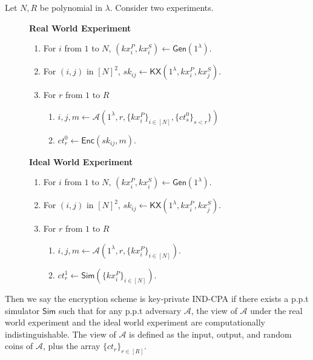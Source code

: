 \documentclass[sigconf, nonacm, balance=false, natbib=false, screen]{acmart}
\newcommand{\gen}{\mathsf{Gen}}
\newcommand{\enc}{\mathsf{Enc}}
\newcommand{\Sim}{\mathsf{Sim}}
\newcommand{\cA}{\mathcal{A}}
\begin{document}
\begin{definition}
Let $N, R$ be polynomial in $\lambda$. Consider two experiments.
\begin{figure}[h!]
\begin{framed}
\textbf{Real World Experiment}
\begin{enumerate}
    \item For $i$ from $1$ to $N$, $(kx_i^P, kx_i^S) \leftarrow \gen(1^{\lambda}).$
    \item For $(i, j)$ in $[N]^2$, $sk_{ij} \leftarrow \mathsf{KX}(1^{\lambda}, kx_i^P, kx_j^S)$.
    \item For $r$ from $1$ to $R$
    \begin{enumerate}
        \item $i, j, m \leftarrow \cA(1^{\lambda}, r, \{kx_i^P\}_{i \in [N]}, \{ct_{s}^0\}_{s < r}\})$
        \item $ct^{0}_r \leftarrow \enc(sk_{ij}, m)$.
    \end{enumerate}
\end{enumerate}
\textbf{Ideal World Experiment}
\begin{enumerate}
    \item For $i$ from $1$ to $N$, $(kx_i^P, kx_i^S) \leftarrow \gen(1^{\lambda}).$
    \item For $(i, j)$ in $[N]^2$, $sk_{ij} \leftarrow \mathsf{KX}(1^{\lambda}, kx_i^P, kx_j^S)$.
    \item For $r$ from $1$ to $R$
    \begin{enumerate}
        \item $i, j, m \leftarrow \cA(1^{\lambda}, r, \{kx_i^P\}_{i \in [N]})$.
        \item $ct^1_r \leftarrow \Sim(\{kx_i^P\}_{i \in [N]})$.
    \end{enumerate}
\end{enumerate}
\end{framed}
\end{figure}
Then we say the encryption scheme is key-private IND-CPA if there exists a p.p.t simulator $\Sim$ such that for any p.p.t adversary $\cA$, the view of $\cA$ under the real world experiment and the ideal world experiment are computationally indistinguishable. The view of $\cA$ is defined as the input, output, and random coins of $\cA$, plus the array $\{ct_r\}_{r \in [R]}$.
\end{definition}
\end{document}
